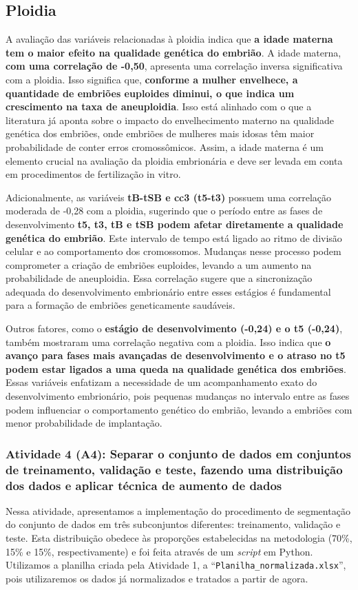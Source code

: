 \subsection*{Ploidia}
A avaliação das variáveis relacionadas à ploidia indica que \textbf{a idade materna tem o maior efeito na qualidade genética do embrião}. A idade materna, \textbf{com uma correlação de -0,50}, apresenta uma correlação inversa significativa com a ploidia. Isso significa que, \textbf{conforme a mulher envelhece, a quantidade de embriões euploides diminui, o que indica um crescimento na taxa de aneuploidia}. Isso está alinhado com o que a literatura já aponta sobre o impacto do envelhecimento materno na qualidade genética dos embriões, onde embriões de mulheres mais idosas têm maior probabilidade de conter erros cromossômicos. Assim, a idade materna é um elemento crucial na avaliação da ploidia embrionária e deve ser levada em conta em procedimentos de fertilização in vitro.

Adicionalmente, as variáveis \textbf{tB-tSB e cc3 (t5-t3)} possuem uma correlação moderada de -0,28 com a ploidia, sugerindo que o período entre as fases de desenvolvimento \textbf{t5, t3, tB e tSB podem afetar diretamente a qualidade genética do embrião}. Este intervalo de tempo está ligado ao ritmo de divisão celular e ao comportamento dos cromossomos. Mudanças nesse processo podem comprometer a criação de embriões euploides, levando a um aumento na probabilidade de aneuploidia. Essa correlação sugere que a sincronização adequada do desenvolvimento embrionário entre esses estágios é fundamental para a formação de embriões geneticamente saudáveis.

Outros fatores, como o \textbf{estágio de desenvolvimento (-0,24) e o t5 (-0,24)}, também mostraram uma correlação negativa com a ploidia. Isso indica que \textbf{o avanço para fases mais avançadas de desenvolvimento e o atraso no t5 podem estar ligados a uma queda na qualidade genética dos embriões}. Essas variáveis enfatizam a necessidade de um acompanhamento exato do desenvolvimento embrionário, pois pequenas mudanças no intervalo entre as fases podem influenciar o comportamento genético do embrião, levando a embriões com menor probabilidade de implantação.

\subsubsection{Atividade 4 (A4): Separar o conjunto de dados em conjuntos de treinamento, validação e teste, fazendo uma distribuição dos dados e aplicar técnica de aumento de dados}
Nessa atividade, apresentamos a implementação do procedimento de segmentação do conjunto de dados em três subconjuntos diferentes: treinamento, validação e teste. Esta distribuição obedece às proporções estabelecidas na metodologia (70\%, 15\% e 15\%, respectivamente) e foi feita através de um \textit{script} em Python. Utilizamos a planilha criada pela Atividade 1, a ``\texttt{Planilha\_normalizada.xlsx}'', pois utilizaremos os dados já normalizados e tratados a partir de agora.

